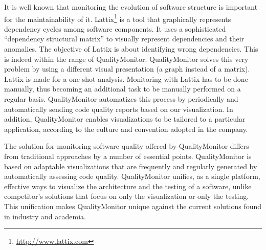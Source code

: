 \documentclass[runningheads]{llncs}
\begin{document}
It is well known that monitoring the evolution of software structure is important for the maintainability of it. Lattix\footnote{\url{http://www.lattix.com}} is a tool that graphically represents dependency cycles among software components. It uses a sophisticated ``dependency structural matrix'' to visually represent dependencies and their anomalies. The objective of Lattix is about identifying wrong dependencies. This is indeed within the range of QualityMonitor. QualityMonitor solves this very problem by using a different visual presentation (a graph instead of a matrix). Lattix is made for a one-shot analysis. Monitoring with Lattix has to be done manually, thus becoming an additional task to be manually performed on a regular basis. QualityMonitor automatizes this process by periodically and automatically sending code quality reports based on our visualization. In addition, QualityMonitor enables visualizations to be tailored to a particular application, according to the culture and convention adopted in the company.

The solution for monitoring software quality offered by QualityMonitor differs from traditional approaches by a number of essential points. QualityMonitor is based on adaptable visualizations that are frequently and regularly generated by automatically assessing code quality. 
QualityMonitor unifies, as a single platform, effective ways to visualize the architecture and the testing of a software, unlike competitor's solutions that focus on only the visualization or only the testing. This unification makes QualityMonitor unique against the current solutions found in industry and academia.

\end{document}
